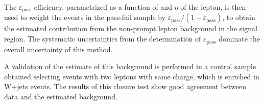 The $\varepsilon_\mathrm{pass}$ efficiency, parametrized as a function of \pt and $\eta$ of the lepton, is then used to weight the events in the pass-fail sample by $\varepsilon_\mathrm{pass}/(1-\varepsilon_\mathrm{pass})$, to obtain the estimated contribution from the non-prompt lepton background in the signal region. The systematic uncertainties from the determination of $\varepsilon_\mathrm{pass}$ dominate the overall uncertainty of this method.

A validation of the estimate of this background is performed in a control sample obtained selecting events with two leptons with same charge, which is enriched in W+jets events. The results of this closure test show good agreement between data and the estimated background.

